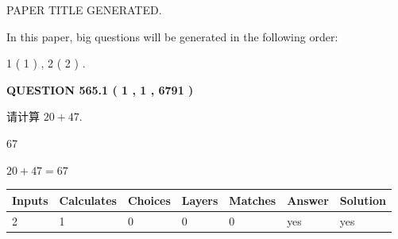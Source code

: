 \documentclass{ctexart}
\begin{document}
   
 \vspace{0.2in}
 
 
 
 
   
   
 PAPER TITLE GENERATED.
   
   
   
\vspace{0.2in}
   
In this paper, big questions will be generated in the following order: 
   
   
   1 ( 1 )
 ,
   2 ( 2 )
 .
  
\vspace{0.2in}
  
{\textbf{\Large{QUESTION
565.1 
 ( 1 , 1 , 6791 )
}}}
  
  
 
请计算 $ %
20 +  %
47 $.
 
 
 
\noindent{}
 
 

67
 
 
\noindent{}
 
 

 
 
 
\noindent{}
 
 

$ %
20 +  %
47=   %
67$
 
 
\noindent{}
 
 

 
   
   
   
   
\noindent\begin{tabular}{|l|l|l|l|l|l|l|}
 \hline
Inputs & Calculates & Choices & Layers & Matches & Answer & Solution \\ \hline
 2  & 
 1  & 
 0
  & 
 0  & 
 0  & 
  yes & 
  yes 
  \\ \hline
 \end{tabular}
   
   
   
   
\noindent{}
   
   
  
\end{document}
